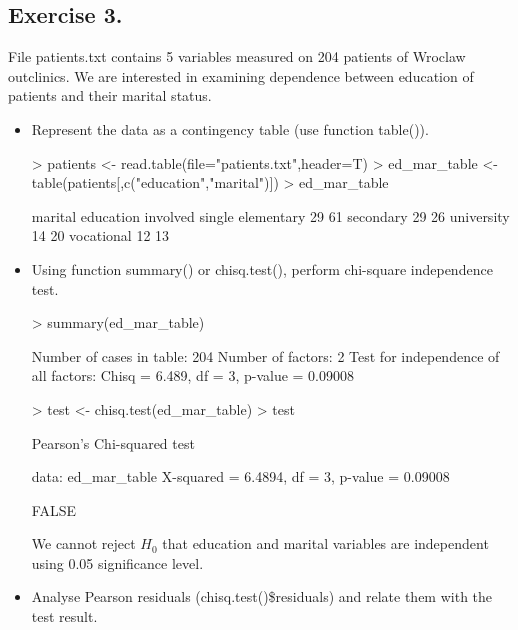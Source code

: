 \documentclass[a4paper]{article}
\begin{document}
\subsection{Exercise 3.}
File patients.txt contains 5 variables measured on 204 patients of Wroclaw outclinics. We are interested in examining dependence between education of patients and their marital status.
\begin{itemize}
\item Represent the data as a contingency table (use function table()).
\begin{Schunk}
\begin{Sinput}
> patients <- read.table(file="patients.txt",header=T)
> ed_mar_table <- table(patients[,c("education","marital")])
> ed_mar_table
\end{Sinput}
\begin{Soutput}
            marital
education    involved single
  elementary       29     61
  secondary        29     26
  university       14     20
  vocational       12     13
\end{Soutput}
\end{Schunk}
\item Using function summary() or chisq.test(), perform chi-square independence test.
\begin{Schunk}
\begin{Sinput}
> summary(ed_mar_table)
\end{Sinput}
\begin{Soutput}
Number of cases in table: 204 
Number of factors: 2 
Test for independence of all factors:
	Chisq = 6.489, df = 3, p-value = 0.09008
\end{Soutput}
\begin{Sinput}
> test <- chisq.test(ed_mar_table)
> test
\end{Sinput}
\begin{Soutput}
	Pearson's Chi-squared test

data:  ed_mar_table
X-squared = 6.4894, df = 3, p-value = 0.09008
\end{Soutput}
\begin{Soutput}
[1] FALSE
\end{Soutput}
\end{Schunk}
We cannot reject $H_0$ that education and marital variables are independent using 0.05 significance level. 
\item Analyse Pearson residuals (chisq.test()\$residuals) and relate them with the test result.


\end{itemize}
\end{document}
